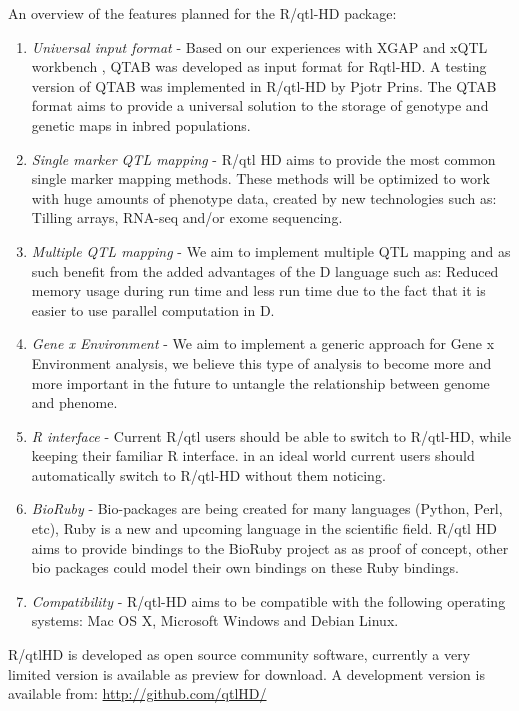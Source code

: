 An overview of the features planned for the R/qtl-HD package:
\begin{enumerate}\itemsep1pt
\item \emph{Universal input format} - Based on our experiences with XGAP \cite{Swertz:2010a} and xQTL workbench 
\cite{Arends:2012}, QTAB was developed as input format for Rqtl-HD. A testing version of QTAB was implemented in 
R/qtl-HD by Pjotr Prins. The QTAB format aims to provide a universal solution to the storage of genotype and genetic 
maps in inbred populations.
\item \emph{Single marker QTL mapping} - R/qtl HD aims to provide the most common single marker mapping methods. 
These methods will be optimized to work with huge amounts of phenotype data, created by new technologies such as: 
Tilling arrays, RNA-seq and/or exome sequencing.
\item \emph{Multiple QTL mapping} - We aim to implement multiple QTL mapping and as such benefit from the added 
advantages of the D language such as: Reduced memory usage during run time and less run time due to the fact that 
it is easier to use parallel computation in D.
\item \emph{Gene x Environment} - We aim to implement a generic approach for Gene x Environment analysis, we believe 
this type of analysis to become more and more important in the future to untangle the relationship between genome and 
phenome.
\item \emph{R interface} - Current R/qtl users should be able to switch to R/qtl-HD, while keeping their familiar 
R interface. in an ideal world current users should automatically switch to R/qtl-HD without them noticing.
\item \emph{BioRuby} - Bio-packages are being created for many languages (Python, Perl, etc), Ruby is a new and 
upcoming language in the scientific field. R/qtl HD aims to provide bindings to the BioRuby project \cite{Goto:2010} 
as as proof of concept, other bio packages could model their own bindings on these Ruby bindings.
\item \emph{Compatibility} - R/qtl-HD aims to be compatible with the following operating systems: Mac OS X, 
Microsoft Windows and Debian Linux.
\end{enumerate}

R/qtlHD is developed as open source community software, currently a very limited version 
is available as preview for download. A development version is available from: 
\url{http://github.com/qtlHD/}

